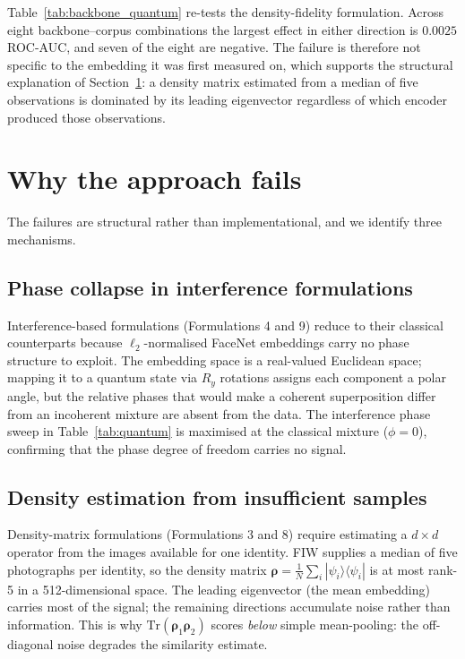\documentclass[preprint,12pt]{elsarticle}
\newcommand{\ket}[1]{|#1\rangle}
\newcommand{\bra}[1]{\langle#1|}
\begin{document}
Table~\ref{tab:backbone_quantum} re-tests the density-fidelity formulation.
Across eight backbone--corpus combinations the largest effect in either
direction is $0.0025$ ROC-AUC, and seven of the eight are negative. The failure
is therefore not specific to the embedding it was first measured on, which
supports the structural explanation of Section~\ref{sec:why}: a density matrix
estimated from a median of five observations is dominated by its leading
eigenvector regardless of which encoder produced those observations.

\section{Why the approach fails}
\label{sec:why}

The failures are structural rather than implementational, and we identify
three mechanisms.

\subsection{Phase collapse in interference formulations}

Interference-based formulations (Formulations 4 and 9) reduce to their
classical counterparts because $\ell_2$-normalised FaceNet embeddings carry
no phase structure to exploit. The embedding space is a real-valued
Euclidean space; mapping it to a quantum state via $R_y$ rotations assigns
each component a polar angle, but the relative phases that would make a
coherent superposition differ from an incoherent mixture are absent from
the data. The interference phase sweep in Table~\ref{tab:quantum} is
maximised at the classical mixture ($\phi = 0$), confirming that the phase
degree of freedom carries no signal.

\subsection{Density estimation from insufficient samples}

Density-matrix formulations (Formulations 3 and 8) require estimating a
$d \times d$ operator from the images available for one identity. FIW
supplies a median of five photographs per identity, so the density matrix
$\bm{\rho} = \frac{1}{N}\sum_i \ket{\psi_i}\bra{\psi_i}$ is at most
rank-5 in a 512-dimensional space. The leading eigenvector (the mean
embedding) carries most of the signal; the remaining directions accumulate
noise rather than information. This is why $\mathrm{Tr}(\bm{\rho}_1
\bm{\rho}_2)$ scores \emph{below} simple mean-pooling: the off-diagonal
noise degrades the similarity estimate.
\end{document}
